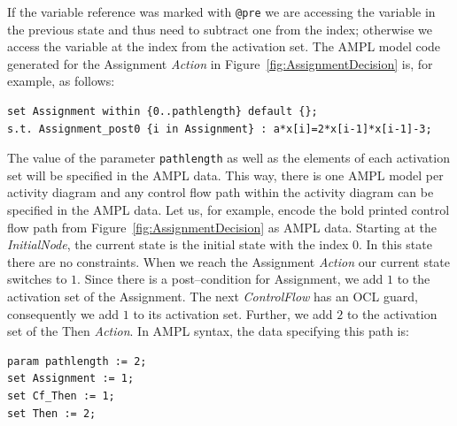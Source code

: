 \documentclass[runningheads,a4paper]{llncs}%
\newcommand{\UMLType}[1]{\textsf{\textit{#1}}} %
\newcommand{\AMPLCode}[1]{\texttt{#1}}
\begin{document}
If the variable reference was marked with \verb=@pre= we are accessing the
variable in the previous state and thus need to subtract one from the index;
otherwise we access the variable at the index from the activation set. The AMPL
model code generated for the Assignment \UMLType{Action} in
Figure~\ref{fig:AssignmentDecision} is, for example, as follows:%
\begin{lstlisting}[basicstyle=\ttfamily,language=ampl,breaklines=true]
set Assignment within {0..pathlength} default {};
s.t. Assignment_post0 {i in Assignment} : a*x[i]=2*x[i-1]*x[i-1]-3;
\end{lstlisting}
The value of the parameter \AMPLCode{pathlength} as well as the elements of each
activation set will be specified in the AMPL data. This way, there is one AMPL
model per activity diagram and any control flow path within the activity diagram
can be specified in the AMPL data. Let us, for example, encode the bold printed
control flow path from Figure~\ref{fig:AssignmentDecision} as AMPL data. Starting at the
\UMLType{InitialNode}, the current state is the initial state with the index
$0$. In this state there are no constraints. When we reach the Assignment
\UMLType{Action} our current state switches to $1$. Since there is a
post--condition for Assignment, we add $1$ to the activation set of the
Assignment. The next \UMLType{ControlFlow} has an OCL guard, consequently we add
$1$ to its activation set. Further, we add $2$ to the activation set of the Then
\UMLType{Action}. In AMPL syntax, the data specifying this path is:%
\begin{lstlisting}[basicstyle=\ttfamily,language=ampl]
param pathlength := 2;
set Assignment := 1;
set Cf_Then := 1;
set Then := 2;
\end{lstlisting}%
\end{document}

